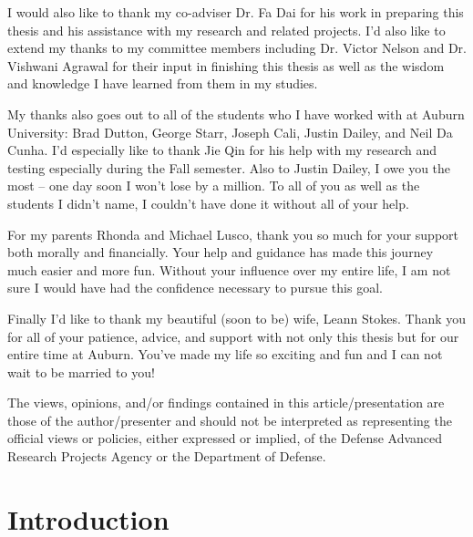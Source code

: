 \documentclass[12pt]{report}
\begin{document}
\begin{romanpages}
\begin{acknowledgments}
I would also like to thank my co-adviser Dr. Fa Dai for his work in preparing this thesis and his assistance with my research and related projects.  I'd also like to extend my thanks to my committee members including Dr. Victor Nelson and Dr. Vishwani Agrawal for their input in finishing this thesis as well as the wisdom and knowledge I have learned from them in my studies.

My thanks also goes out to all of the students who I have worked with at Auburn University: Brad Dutton, George Starr, Joseph Cali, Justin Dailey, and Neil Da Cunha.  I'd especially like to thank Jie Qin for his help with my research and testing especially during the Fall semester.  Also to Justin Dailey, I owe you the most -- one day soon I won't lose by a million.  To all of you as well as the students I didn't name, I couldn't have done it without all of your help.

For my parents Rhonda and Michael Lusco, thank you so much for your support both morally and financially.  Your help and guidance has made this journey much easier and more fun.  Without your influence over my entire life, I am not sure I would have had the confidence necessary to pursue this goal.

Finally I'd like to thank my beautiful (soon to be) wife, Leann Stokes.  Thank you for all of your patience, advice, and support with not only this thesis but for our entire time at Auburn.  You've made my life so exciting and fun and I can not wait to be married to you!



The views, opinions, and/or findings contained in this article/presentation are those of the author/presenter and should not be interpreted as representing the official views or policies, either expressed or implied, of the Defense Advanced Research Projects Agency or the Department of Defense.
\end{acknowledgments}

\tableofcontents
\listoffigures
\listoftables

\printnomenclature[0.5in] %
\end{romanpages}        %


\normalem       %


\chapter{Introduction}  %
\end{document}
